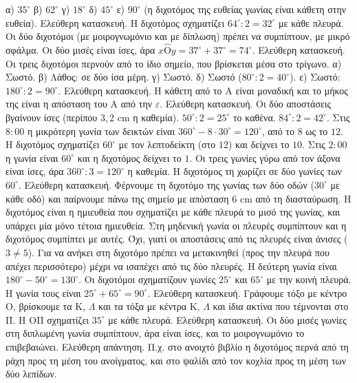  α) $35^\circ$ \quad β) $62^\circ$ \quad γ) $18^\circ$ \quad δ) $45^\circ$ \quad ε) $90^\circ$ (η διχοτόμος της ευθείας γωνίας είναι κάθετη στην ευθεία).
 Ελεύθερη κατασκευή. Η διχοτόμος σχηματίζει $64^\circ:2=32^\circ$ με κάθε πλευρά. Οι δύο διχοτόμοι (με μοιρογνωμόνιο και με δίπλωση) πρέπει να συμπίπτουν, με μικρό σφάλμα.
 Οι δύο μισές είναι ίσες, άρα $x\hat{\mathrm{Ο}}y=37^\circ+37^\circ=74^\circ$.
 Ελεύθερη κατασκευή. Οι τρεις διχοτόμοι περνούν από το ίδιο σημείο, που βρίσκεται μέσα στο τρίγωνο.
 α) Σωστό. β) Λάθος: σε δύο ίσα μέρη. γ) Σωστό. δ) Σωστό ($80^\circ:2=40^\circ$). ε) Σωστό: $180^\circ:2=90^\circ$.
 Ελεύθερη κατασκευή. Η κάθετη από το $\mathrm{Α}$ είναι μοναδική και το μήκος της είναι η απόσταση του $\mathrm{Α}$ από την $\varepsilon$.
 Ελεύθερη κατασκευή. Οι δύο αποστάσεις βγαίνουν ίσες (περίπου $3{,}2$ cm η καθεμία).
 $50^\circ:2=25^\circ$ το καθένα.
 $84^\circ:2=42^\circ$.
 Στις $8{:}00$ η μικρότερη γωνία των δεικτών είναι $360^\circ-8\cdot30^\circ=120^\circ$, από το $8$ ως το $12$. Η διχοτόμος σχηματίζει $60^\circ$ με τον λεπτοδείκτη (στο $12$) και δείχνει το $10$. Στις $2{:}00$ η γωνία είναι $60^\circ$ και η διχοτόμος δείχνει το $1$.
 Οι τρεις γωνίες γύρω από τον άξονα είναι ίσες, άρα $360^\circ:3=120^\circ$ η καθεμία. Η διχοτόμος τη χωρίζει σε δύο γωνίες των $60^\circ$.
 Ελεύθερη κατασκευή. Φέρνουμε τη διχοτόμο της γωνίας των δύο οδών ($30^\circ$ με κάθε οδό) και παίρνουμε πάνω της σημείο με απόσταση $6$ cm από τη διασταύρωση.
 Η διχοτόμος είναι η ημιευθεία που σχηματίζει με κάθε πλευρά το μισό της γωνίας, και υπάρχει μία μόνο τέτοια ημιευθεία. Στη μηδενική γωνία οι πλευρές συμπίπτουν και η διχοτόμος συμπίπτει με αυτές.
 Όχι, γιατί οι αποστάσεις από τις πλευρές είναι άνισες ($3\neq5$). Για να ανήκει στη διχοτόμο πρέπει να μετακινηθεί (προς την πλευρά που απέχει περισσότερο) μέχρι να ισαπέχει από τις δύο πλευρές.
 Η δεύτερη γωνία είναι $180^\circ-50^\circ=130^\circ$. Οι διχοτόμοι σχηματίζουν γωνίες $25^\circ$ και $65^\circ$ με την κοινή πλευρά. Η γωνία τους είναι $25^\circ+65^\circ=90^\circ$.
 Ελεύθερη κατασκευή. Γράφουμε τόξο με κέντρο $\mathrm{Ο}$, βρίσκουμε τα $\mathrm{Κ}$, $\Lambda$ και τα τόξα με κέντρα $\mathrm{Κ}$, $\Lambda$ και ίδια ακτίνα που τέμνονται στο $\mathrm{Π}$. Η $\mathrm{ΟΠ}$ σχηματίζει $35^\circ$ με κάθε πλευρά.
 Ελεύθερη κατασκευή. Οι δύο μισές γωνίες στη διπλωμένη γωνία συμπίπτουν, άρα είναι ίσες, και το μοιρογνωμόνιο το επιβεβαιώνει.
 Ελεύθερη απάντηση. Π.χ. στο ανοιχτό βιβλίο η διχοτόμος περνά από τη ράχη προς τη μέση του ανοίγματος, και στο ψαλίδι από τον κοχλία προς τη μέση των δύο λεπίδων.
